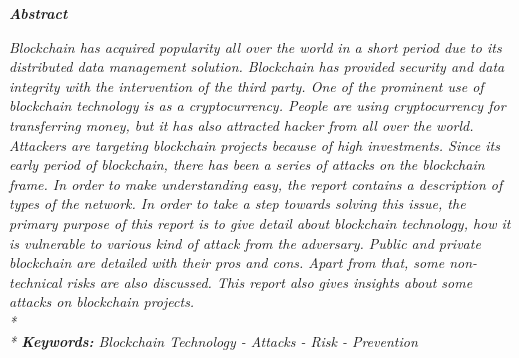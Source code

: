 \documentclass[a4paper,twoside,12pt]{report}
\begin{document}
\begin{spacing}{1}  %
\begingroup
\fontsize{12pt}{14pt}\selectfont
\begin{center}
	\Huge\bfseries
	\textit{Abstract}
\end{center}
\vspace{0.3in}
\textit{\fontsize{10}{10}\selectfont Blockchain has acquired popularity all over the world in a short period due to its distributed data management solution. Blockchain has provided security and data integrity with the intervention of the third party. One of the prominent use of blockchain technology is as a cryptocurrency. People are using cryptocurrency for transferring money, but it has also attracted hacker from all over the world. Attackers are targeting blockchain projects because of high investments. Since its early period of blockchain, there has been a series of attacks on the blockchain frame. In order to make understanding easy, the report contains a description of types of the network. In order to take a step towards solving this issue, the primary purpose of this report is to give detail about blockchain technology, how it is vulnerable to various kind of attack from the adversary. Public and private blockchain are detailed with their pros and cons. Apart from that, some non-technical risks are also discussed. This report also gives insights about some attacks on blockchain projects.   
\\*
\\*
\textbf{Keywords:} Blockchain Technology - Attacks - Risk - Prevention 
}
\endgroup
\end{spacing}
\end{document}
